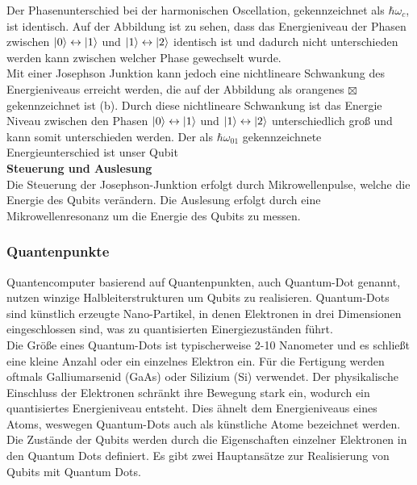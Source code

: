 Der Phasenunterschied bei der harmonischen Oscellation, gekennzeichnet als $\hbar\omega_c$, ist identisch. Auf der Abbildung ist zu sehen, dass das Energieniveau der Phasen zwischen $\ket{0} \leftrightarrow \ket{1}$
und $\ket{1} \leftrightarrow \ket{2}$ identisch ist und dadurch nicht unterschieden werden kann zwischen welcher Phase gewechselt wurde.\\

Mit einer Josephson Junktion kann jedoch eine nichtlineare Schwankung des Energieniveaus erreicht werden, die auf der Abbildung als orangenes $\boxtimes$ gekennzeichnet ist (b).
Durch diese nichtlineare Schwankung ist das Energie Niveau zwischen den Phasen $\ket{0} \leftrightarrow \ket{1}$ und $\ket{1} \leftrightarrow \ket{2}$ unterschiedlich groß und kann somit unterschieden werden.
Der als $\hbar\omega_{01}$ gekennzeichnete Energieunterschied ist unser Qubit\\

\textbf{Steuerung und Auslesung}\\
Die Steuerung der Josephson-Junktion erfolgt durch Mikrowellenpulse, welche die Energie des Qubits verändern. Die Auslesung erfolgt durch eine Mikrowellenresonanz um die Energie des Qubits zu messen.\\

\subsubsection{Quantenpunkte}
\label{subsub:quantenpunkte}
Quantencomputer basierend auf Quantenpunkten, auch Quantum-Dot genannt, nutzen winzige Halbleiterstrukturen um Qubits zu realisieren.
Quantum-Dots sind künstlich erzeugte Nano-Partikel, in denen Elektronen in drei Dimensionen eingeschlossen sind, was zu quantisierten Einergiezuständen führt.\\

Die Größe eines Quantum-Dots ist typischerweise 2-10 Nanometer und es schließt eine kleine Anzahl oder ein einzelnes Elektron ein.
Für die Fertigung werden oftmals Galliumarsenid (GaAs) oder Silizium (Si) verwendet. Der physikalische Einschluss der Elektronen schränkt ihre
Bewegung stark ein, wodurch ein quantisiertes Energieniveau entsteht. Dies ähnelt dem Energieniveaus eines Atoms, weswegen Quantum-Dots auch als künstliche Atome bezeichnet werden.\\

Die Zustände der Qubits werden durch die Eigenschaften einzelner Elektronen in den Quantum Dots definiert. Es gibt zwei Hauptansätze zur Realisierung von Qubits mit Quantum Dots.\\

